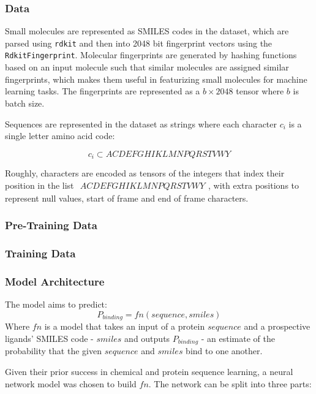 \documentclass{article}
\begin{document}
\subsubsection{Data}

Small molecules are represented as SMILES codes in the dataset, which are parsed using \texttt{rdkit} and then into 2048 bit fingerprint vectors using the \texttt{RdkitFingerprint}.
Molecular fingerprints are generated by hashing functions based on an input molecule such that similar molecules are assigned similar fingerprints, which makes them useful in featurizing small molecules for machine learning tasks.
The fingerprints are represented as a $b \times 2048$ tensor where $b$ is batch size.

Sequences are represented in the dataset as strings where each character $c_i$ is a single letter amino acid code:

$$c_i \subset{ACDEFGHIKLMNPQRSTVWY}$$

Roughly, characters are encoded as tensors of the integers that index their position in the list $\begin{matrix} ACDEFGHIKLMNPQRSTVWY\end{matrix}$, with extra positions to represent null values, start of frame and end of frame characters.

	\subsubsection{Pre-Training Data}

\subsubsection{Training Data}

\subsubsection{Model Architecture}

The model aims to predict:
$$
P_{binding} = fn(sequence, smiles)
$$
Where $fn$ is a model that takes an input of a protein $sequence$ and a prospective ligands' SMILES code - $smiles$ and outputs $P_{binding}$ - an estimate of the probability that the given $sequence$ and $smiles$ bind to one another.

Given their prior success in chemical and protein sequence learning, a neural network model was chosen to build  $fn$.
The network can be split into three parts:
\end{document}
